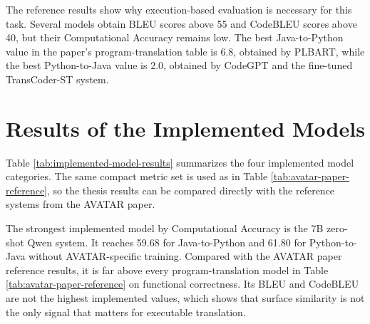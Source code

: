 The reference results show why execution-based evaluation is necessary for this
task. Several models obtain BLEU scores above 55 and CodeBLEU scores above 40,
but their Computational Accuracy remains low. The best Java-to-Python value in
the paper's program-translation table is 6.8, obtained by PLBART, while the
best Python-to-Java value is 2.0, obtained by CodeGPT and the fine-tuned
TransCoder-ST system.

\section{Results of the Implemented Models}

\quad Table \ref{tab:implemented-model-results} summarizes the four implemented
model categories. The same compact metric set is used as in Table
\ref{tab:avatar-paper-reference}, so the thesis results can be compared
directly with the reference systems from the AVATAR paper.

\begin{table}[htbp]
\centering
\caption{Results of the implemented models on the AVATAR test split.}
\label{tab:implemented-model-results}
\end{table}

The strongest implemented model by Computational Accuracy is the 7B zero-shot
Qwen system. It reaches 59.68 for Java-to-Python and 61.80 for Python-to-Java
without AVATAR-specific training. Compared with the AVATAR paper reference
results, it is far above every program-translation model in Table
\ref{tab:avatar-paper-reference} on functional correctness. Its BLEU and
CodeBLEU are not the highest implemented values, which shows that surface
similarity is not the only signal that matters for executable translation.


